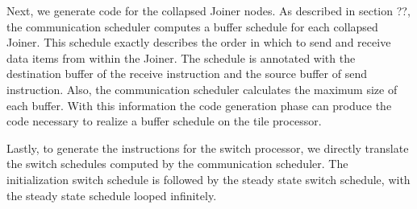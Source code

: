 Next, we generate code for the collapsed Joiner nodes.  As described
in section ??, the communication scheduler computes a buffer schedule
for each collapsed Joiner.  This schedule exactly describes the order
in which to send and receive data items from within the Joiner.  The
schedule is annotated with the destination buffer of the receive
instruction and the source buffer of send instruction.  Also, the
communication scheduler calculates the maximum size of each buffer.
With this information the code generation phase can produce the code
necessary to realize a buffer schedule on the tile processor.

Lastly, to generate the instructions for the switch processor, we
directly translate the switch schedules computed by the communication
scheduler.  The initialization switch schedule is followed by the steady
state switch schedule, with the steady state schedule looped infinitely.

